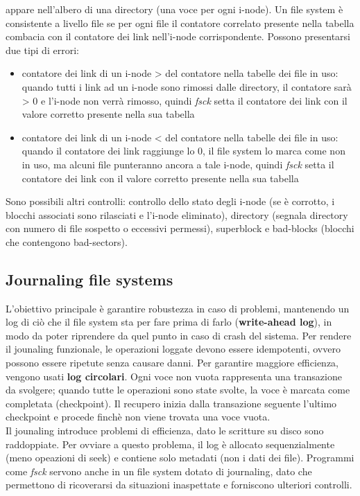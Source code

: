 \documentclass[12pt]{article}
\begin{document}
appare nell'albero di una directory (una voce per ogni i-node). Un file system è consistente a livello file se per ogni 
file il contatore correlato presente nella tabella combacia con il contatore dei link nell'i-node corrispondente.
Possono presentarsi due tipi di errori:
\begin{itemize}
    \item contatore dei link di un i-node > del contatore nella tabelle dei file in uso: quando tutti i link ad un i-node
    sono rimossi dalle directory, il contatore sarà > 0 e l'i-node non verrà rimosso, quindi \textit{fsck} setta il 
    contatore dei link con il valore corretto presente nella sua tabella
    \item contatore dei link di un i-node < del contatore nella tabelle dei file in uso: quando il contatore dei link
    raggiunge lo 0, il file system lo marca come non in uso, ma alcuni file punteranno ancora a tale i-node, quindi
    \textit{fsck} setta il contatore dei link con il valore corretto presente nella sua tabella
\end{itemize}
Sono possibili altri controlli: controllo dello stato degli i-node (se è corrotto, i blocchi associati sono rilasciati 
e l'i-node eliminato), directory (segnala directory con numero di file sospetto o eccessivi permessi), superblock e 
bad-blocks (blocchi che contengono bad-sectors).
\subsection{Journaling file systems}
L'obiettivo principale è garantire robustezza in caso di problemi, mantenendo un log di ciò che il file system sta per
fare prima di farlo (\textbf{write-ahead log}), in modo da poter riprendere da quel punto in caso di crash del sistema.
Per rendere il jounaling funzionale, le operazioni loggate devono essere idempotenti, ovvero possono essere ripetute
senza causare danni. Per garantire maggiore efficienza, vengono usati \textbf{log circolari}. Ogni voce non vuota
rappresenta una transazione da svolgere; quando tutte le operazioni sono state svolte, la voce è marcata come completata
(checkpoint). Il recupero inizia dalla transazione seguente l'ultimo checkpoint e procede finchè non viene trovata una
voce vuota.\\
Il jounaling introduce problemi di efficienza, dato le scritture su disco sono raddoppiate. Per ovviare a questo 
problema, il log è allocato sequenzialmente (meno opeazioni di seek) e contiene solo metadati (non i dati dei file).
Programmi come \textit{fsck} servono anche in un file system dotato di journaling, dato che permettono di ricoverarsi
da situazioni inaspettate e forniscono ulteriori controlli.
\end{document}
